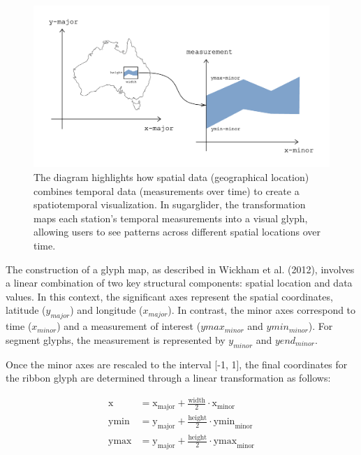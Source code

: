\begin{figure}

{\centering \includegraphics[width=0.9\linewidth]{figures/diagram-transformation} 

}

\caption{The diagram highlights how spatial data (geographical location) combines temporal data (measurements over time) to create a spatiotemporal visualization. In sugarglider, the transformation maps each station's temporal measurements into a visual glyph, allowing users to see patterns across different spatial locations over time.}\label{fig:unnamed-chunk-7}
\end{figure}

The construction of a glyph map, as described in Wickham et al. (2012), involves a linear combination of two key structural components: spatial location and data values. In this context, the significant axes represent the spatial coordinates, latitude (\(y_{major}\)) and longitude (\(x_{major}\)). In contrast, the minor axes correspond to time (\(x_{minor}\)) and a measurement of interest (\(ymax_{minor}\) and \(ymin_{minor}\)). For segment glyphs, the measurement is represented by \(y_{minor}\) and \(yend_{minor}\).

Once the minor axes are rescaled to the interval {[}-1, 1{]}, the final coordinates for the ribbon glyph are determined through a linear transformation as follows:

\begin{align}
\text{x} &= \text{x}_{\text{major}} + \frac{\text{width}}{2} \cdot \text{x}_{\text{minor}} \\
\text{ymin} &= \text{y}_{\text{major}} + \frac{\text{height}}{2} \cdot \text{ymin}_{\text{minor}} \\
\text{ymax} &= \text{y}_{\text{major}} + \frac{\text{height}}{2} \cdot \text{ymax}_{\text{minor}}
\end{align}

